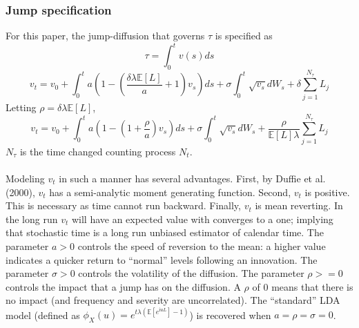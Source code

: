 \documentclass{article}
\theoremstyle{definition}
\begin{document}
\subsubsection{Jump specification}
For this paper, the jump-diffusion that governs \(\tau\) is specified as 
\begin{equation}\tau=\int_0 ^ t v(s)ds\end{equation}
\begin{equation}v_t=v_0+\int_0 ^t a\left(1-\left(\frac{\delta \lambda \mathbb{E}[L]}{a}+1\right)v_s\right)ds+\sigma \int_0 ^ t \sqrt{v_s} dW_s +\delta \sum_{j=1} ^ {N_\tau} L_j \end{equation}
 Letting \(\rho=\delta \lambda \mathbb{E}[L]\),
\begin{equation}\label{tmc}v_t=v_0+\int_0 ^t a\left(1-\left(1+\frac{\rho}{a}\right)v_s\right)ds+\sigma \int_0 ^ t \sqrt{v_s} dW_s +\frac{\rho}{\mathbb{E}[L] \lambda} \sum_{j=1} ^ {N_\tau} L_j \end{equation}
\(N_\tau\) is the time changed counting process \(N_t\).
\\
\\
Modeling \(v_t\) in such a manner has several advantages.  First, by Duffie et al. (2000), \(v_t\) has a semi-analytic moment generating function.  Second, \(v_t\) is positive.  This is necessary as time cannot run backward.  Finally, \(v_t\) is mean reverting.  In the long run \(v_t\) will have an expected value with converges to a one; implying that stochastic time is a long run unbiased estimator of calendar time.  The parameter \(a>0\) controls the speed of reversion to the mean: a higher value indicates a quicker return to ``normal'' levels following an innovation.  The parameter \(\sigma>0\) controls the volatility of the diffusion.  The parameter \(\rho>=0\) controls the impact that a jump has on the diffusion.  A \(\rho\) of \(0\) means that there is no impact (and frequency and severity are uncorrelated).  The ``standard'' LDA model (defined as \(\phi_X(u)=e^{t\lambda \left(\mathbb{E}\left[e^{\mathrm{i}uL}\right]-1\right)}\)) is recovered when \(a=\rho=\sigma=0\).
\end{document}

